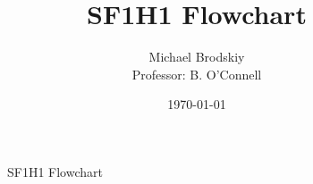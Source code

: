 


\title{SF1H1 Flowchart}
\date{\today}
\author{Michael Brodskiy\\ \small Professor: B. O'Connell}



\maketitle

\begin{figure}[H]
  \centering
  
  \caption{SF1H1 Flowchart}
  \label{fig:1}
\end{figure}



